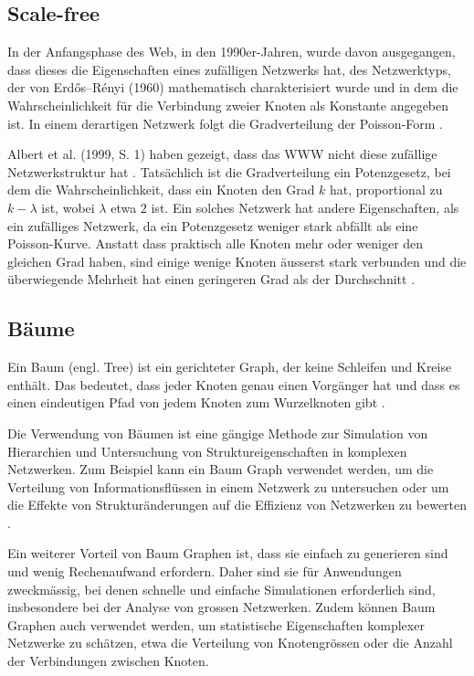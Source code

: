 \subsection{Scale-free}

In der Anfangsphase des Web, in den 1990er-Jahren, wurde davon ausgegangen, dass dieses die Eigenschaften eines zufälligen Netzwerks hat, des Netzwerktyps, der von Erdős–Rényi (1960) mathematisch charakterisiert wurde und in dem die Wahrscheinlichkeit für die Verbindung zweier Knoten als Konstante angegeben ist.
In einem derartigen Netzwerk folgt die Gradverteilung der Poisson-Form \cite{barabasi_network_2016}.

Albert et al. (1999, S. 1) haben gezeigt, dass das WWW nicht diese zufällige Netzwerkstruktur hat \cite{albert_diameter_1999}.
Tatsächlich ist die Gradverteilung ein Potenzgesetz, bei dem die Wahrscheinlichkeit, dass ein Knoten den Grad $k$ hat, proportional zu $k-\lambda$ ist, wobei $\lambda$ etwa $2$ ist.
Ein solches Netzwerk hat andere Eigenschaften, als ein zufälliges Netzwerk, da ein Potenzgesetz weniger stark abfällt als eine Poisson-Kurve.
Anstatt dass praktisch alle Knoten mehr oder weniger den gleichen Grad haben, sind einige wenige Knoten äusserst stark verbunden und die überwiegende Mehrheit hat einen geringeren Grad als der Durchschnitt \cite{barabasi_network_2016}.

\subsection{Bäume}

Ein Baum (engl. Tree) ist ein gerichteter Graph, der keine Schleifen und Kreise enthält.
Das bedeutet, dass jeder Knoten genau einen Vorgänger hat und dass es einen eindeutigen Pfad von jedem Knoten zum Wurzelknoten gibt \cite{cayley_analytical_1881}.

Die Verwendung von Bäumen ist eine gängige Methode zur Simulation von Hierarchien und Untersuchung von Struktureigenschaften in komplexen Netzwerken.
Zum Beispiel kann ein Baum Graph verwendet werden, um die Verteilung von Informationsflüssen in einem Netzwerk zu untersuchen oder um die Effekte von Strukturänderungen auf die Effizienz von Netzwerken zu bewerten \cite{brandstadt_graph_1999}.

Ein weiterer Vorteil von Baum Graphen ist, dass sie einfach zu generieren sind und wenig Rechenaufwand erfordern.
Daher sind sie für Anwendungen zweckmässig, bei denen schnelle und einfache Simulationen erforderlich sind, insbesondere bei der Analyse von grossen Netzwerken. Zudem können Baum Graphen auch verwendet werden, um statistische Eigenschaften komplexer Netzwerke zu schätzen, etwa die Verteilung von Knotengrössen oder die Anzahl der Verbindungen zwischen Knoten.

